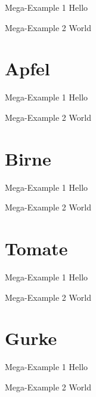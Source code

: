 \documentclass[aspectratio=169,usepdftitle=true]{beamer}
\begin{document}
\begin{frame}{Mega-Example 1}
    Hello
\end{frame}

\begin{frame}{Mega-Example 2}
    World
\end{frame}


\section{Apfel}
\begin{frame}{Mega-Example 1}
    Hello
\end{frame}

\begin{frame}{Mega-Example 2}
    World
\end{frame}

\section{Birne}
\begin{frame}{Mega-Example 1}
    Hello
\end{frame}

\begin{frame}{Mega-Example 2}
    World
\end{frame}

\section{Tomate}
\begin{frame}{Mega-Example 1}
    Hello
\end{frame}

\begin{frame}{Mega-Example 2}
    World
\end{frame}

\section{Gurke}
\begin{frame}{Mega-Example 1}
    Hello
\end{frame}

\begin{frame}{Mega-Example 2}
    World
\end{frame}
\end{document}
